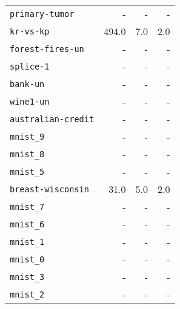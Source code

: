 \begin{tabular}{lrrr}
\texttt{primary-tumor} & - & - & -\\
\texttt{kr-vs-kp} & 494.0 & 7.0 & 2.0\\
\texttt{forest-fires-un} & - & - & -\\
\texttt{splice-1} & - & - & -\\
\texttt{bank-un} & - & - & -\\
\texttt{wine1-un} & - & - & -\\
\texttt{australian-credit} & - & - & -\\
\texttt{mnist\_9} & - & - & -\\
\texttt{mnist\_8} & - & - & -\\
\texttt{mnist\_5} & - & - & -\\
\texttt{breast-wisconsin} & 31.0 & 5.0 & 2.0\\
\texttt{mnist\_7} & - & - & -\\
\texttt{mnist\_6} & - & - & -\\
\texttt{mnist\_1} & - & - & -\\
\texttt{mnist\_0} & - & - & -\\
\texttt{mnist\_3} & - & - & -\\
\texttt{mnist\_2} & - & - & -\\
\bottomrule
\end{tabular}
